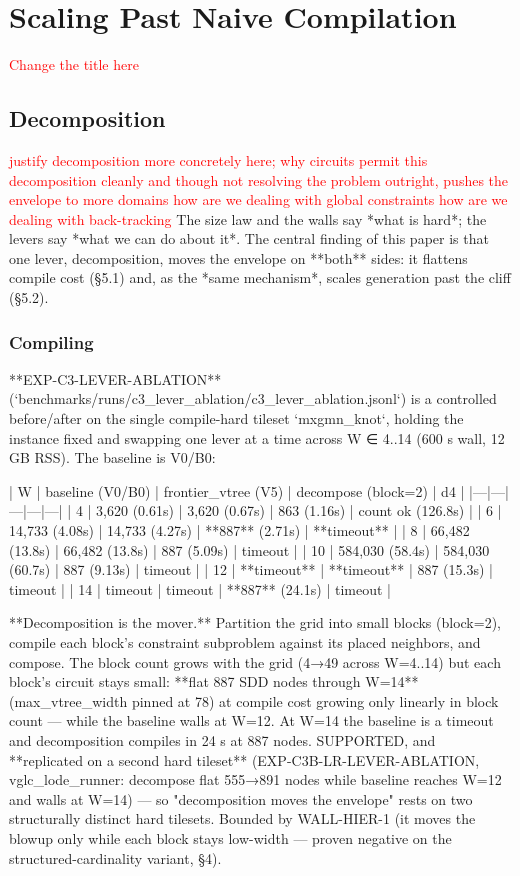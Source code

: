 \documentclass[letterpaper]{article} %
\newcommand{\todo}[1]{\textcolor{red}{#1}}
\begin{document}
\section{Scaling Past Naive Compilation}
\todo{Change the title here}

\subsection{Decomposition}
\todo{justify decomposition more concretely here; why circuits permit this decomposition cleanly and though not resolving the problem outright, pushes the envelope to more domains}
\todo{how are we dealing with global constraints}
\todo{how are we dealing with back-tracking}
The size law and the walls say *what is hard*; the levers say *what we can do about it*. The central
finding of this paper is that one lever, decomposition, moves the envelope on **both** sides: it
flattens compile cost (§5.1) and, as the *same mechanism*, scales generation past the cliff (§5.2).

\subsubsection{Compiling}

**EXP-C3-LEVER-ABLATION** (`benchmarks/runs/c3_lever_ablation/c3_lever_ablation.jsonl`) is a
controlled before/after on the single compile-hard tileset `mxgmn_knot`, holding the instance fixed
and swapping one lever at a time across W ∈ {4..14} (600 s wall, 12 GB RSS). The baseline is V0/B0:

| W | baseline (V0/B0) | frontier_vtree (V5) | decompose (block=2) | d4 |
|---|---|---|---|---|
| 4 | 3,620 (0.61s) | 3,620 (0.67s) | 863 (1.16s) | count ok (126.8s) |
| 6 | 14,733 (4.08s) | 14,733 (4.27s) | **887** (2.71s) | **timeout** |
| 8 | 66,482 (13.8s) | 66,482 (13.8s) | 887 (5.09s) | timeout |
| 10 | 584,030 (58.4s) | 584,030 (60.7s) | 887 (9.13s) | timeout |
| 12 | **timeout** | **timeout** | 887 (15.3s) | timeout |
| 14 | timeout | timeout | **887** (24.1s) | timeout |

**Decomposition is the mover.** Partition the grid into small blocks (block=2), compile each block's
constraint subproblem against its placed neighbors, and compose. The block count grows with the grid
(4→49 across W=4..14) but each block's circuit stays small: **flat 887 SDD nodes through W=14**
(max_vtree_width pinned at 78) at compile cost growing only linearly in block count — while the
baseline walls at W=12. At W=14 the baseline is a timeout and decomposition compiles in 24 s at 887
nodes. SUPPORTED, and **replicated on a second hard tileset** (EXP-C3B-LR-LEVER-ABLATION,
vglc_lode_runner: decompose flat 555→891 nodes while baseline reaches W=12 and walls at W=14) — so
"decomposition moves the envelope" rests on two structurally distinct hard tilesets. Bounded by
WALL-HIER-1 (it moves the blowup only while each block stays low-width — proven negative on the
structured-cardinality variant, §4).
\end{document}
